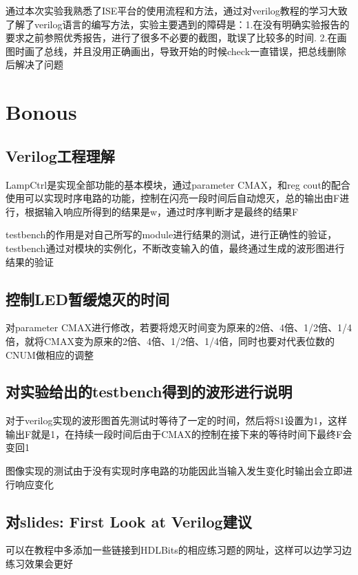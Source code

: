 \documentclass{article}
\begin{document}
通过本次实验我熟悉了ISE平台的使用流程和方法，通过对verilog教程的学习大致了解了verilog语言的编写方法，实验主要遇到的障碍是：1.在没有明确实验报告的要求之前参照优秀报告，进行了很多不必要的截图，耽误了比较多的时间. 2.在画图时画了总线，并且没用正确画出，导致开始的时候check一直错误，把总线删除后解决了问题

\section{Bonous}

\subsection{Verilog工程理解}
LampCtrl是实现全部功能的基本模块，通过parameter CMAX，和reg cout的配合使用可以实现时序电路的功能，控制在闪亮一段时间后自动熄灭，总的输出由F进行，根据输入响应所得到的结果是w，通过时序判断才是最终的结果F

testbench的作用是对自己所写的module进行结果的测试，进行正确性的验证，testbench通过对模块的实例化，不断改变输入的值，最终通过生成的波形图进行结果的验证

\subsection{控制LED暂缓熄灭的时间}
对parameter CMAX进行修改，若要将熄灭时间变为原来的2倍、4倍、1/2倍、1/4倍，就将CMAX变为原来的2倍、4倍、1/2倍、1/4倍，同时也要对代表位数的CNUM做相应的调整

\subsection{对实验给出的testbench得到的波形进行说明}
对于verilog实现的波形图首先测试时等待了一定的时间，然后将S1设置为1，这样输出F就是1，在持续一段时间后由于CMAX的控制在接下来的等待时间下最终F会变回1

图像实现的测试由于没有实现时序电路的功能因此当输入发生变化时输出会立即进行响应变化

\subsection{对slides: First Look at Verilog建议}
可以在教程中多添加一些链接到HDLBits的相应练习题的网址，这样可以边学习边练习效果会更好
\end{document}
